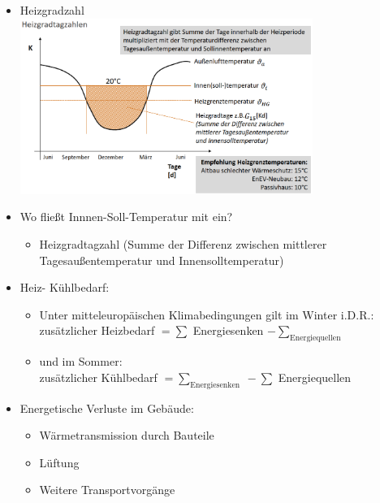 \documentclass[fleqn,twoside,dvipsnames]{article}
\begin{document}
\begin{itemize}
                        \newpage
                    \item Heizgradzahl\\
                            \includegraphics[width=0.75\textwidth]{Grafiken/ES/Heizgradtagzahl.png}
                    \item Wo fließt Innnen-Soll-Temperatur mit ein?
                        \begin{itemize}
                            \item Heizgradtagzahl (Summe der Differenz zwischen mittlerer Tagesaußentemperatur und Innensolltemperatur)
                        \end{itemize}
                    \item Heiz- Kühlbedarf:
                        \begin{itemize}
                            \item Unter mitteleuropäischen Klimabedingungen gilt im Winter i.D.R.:\\
                                zusätzlicher Heizbedarf $=\sum$ Energiesenken $-\sum_{\text {Energiequellen }}$
                            \item und im Sommer:\\
                                zusätzlicher Kühlbedarf $=\sum_{\text {Energiesenken }}-\sum$ Energiequellen
                        \end{itemize}
                    \item Energetische Verluste im Gebäude: 
                        \begin{itemize}
                            \item Wärmetransmission durch Bauteile
                            \item Lüftung
                            \item Weitere Transportvorgänge
                        \end{itemize}

\end{itemize}
\end{document}
